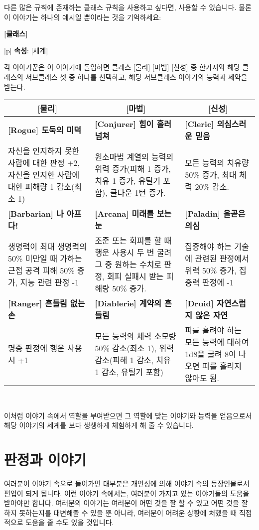 \documentclass[12pt]{report}
\newenvironment{story}[2]
{\begin{center}
		{\large \textbf{[#1]}}\\[1ex]
		\begin{tabular}{|p{\textwidth}|}
			\hline
			\textbf{속성}: #2
			\\
			\hline
		}
		{ 
			\\\hline
		\end{tabular}
	\end{center}
}
\newcommand{\world}[1]{{\nanumpen \large #1 \par}\bigskip}
\begin{document}
	다른 많은 규칙에 존재하는 클래스 규칙을 사용하고 싶다면, 사용할 수 있습니다. 물론 이 이야기는 하나의 예시일 뿐이라는 것을 기억하세요:
	\begin{story}{클래스}{[세계]}
		각 이야기꾼은 이 이야기에 돌입하면 클래스 [물리] [마법] [신성] 중 한가지와 해당 클래스의 서브클래스 셋 중 하나를 선택하고, 해당 서브클래스 이야기의 능력과 제약을 받는다.
		
		\begin{tabularx}{\textwidth}{X|X|X}
			\multicolumn{1}{c|}{\textbf{[물리]}} & \multicolumn{1}{c|}{\textbf{[마법]}} & \multicolumn{1}{c}{\textbf{[신성]}} \\ \hline
			\textbf{[Rogue] 도둑의 미덕} & \textbf{[Conjurer] 힘이 흘러넘쳐} & \textbf{[Cleric] 의심스러운 믿음} \\
			{자신을 인지하지 못한 사람에 대한 판정 +2, 자신을 인지한 사람에 대한 피해량 1 감소(최소 1)} & {원소마법 계열의 능력의 위력 증가(피해 1 증가, 치유 1 증가, 유틸기 포함), 쿨다운 1턴 증가.} & {모든 능력의 치유량 50\% 증가, 최대 체력 20\% 감소.} \\\hline
			\textbf{[Barbarian] 나 아프다!} & \textbf{[Arcana] 미래를 보는 눈} & \textbf{[Paladin] 올곧은 의심} \\ 
			{생명력이 최대 생명력의 50\% 미만일 때 가하는 근접 공격 피해 50\% 증가, 지능 관련 판정 -1} & {조준 또는 회피를 할 때 행운 사용시 두 번 굴려 그 중 원하는 수치로 판정, 회피 실패시 받는 피해량 50\% 증가.} & {집중해야 하는 기술에 관련된 판정에서 위력 50\% 증가, 집중력 판정에 -1} \\ \hline
			\textbf{[Ranger] 흔들림 없는 손} & \textbf{[Diablerie] 계약의 흔들림} & \textbf{[Druid] 자연스럽지 않은 자연} \\ 
			{명중 판정에 행운 사용시 +1} & {모든 능력의 체력 소모량 50\% 감소(최소 1), 위력 감소(피해 1 감소, 치유 1 감소, 유틸기 포함)} & {피를 흘려야 하는 모든 능력에 대하여 1d8을 굴려 8이 나오면 피를 흘리지 않아도 됨.}
		\end{tabularx}
	\end{story}
	
	이처럼 이야기 속에서 역할을 부여받으면 그 역할에 맞는 이야기와 능력을 얻음으로서 해당 이야기의 세계를 보다 생생하게 체험하게 해 줄 수 있습니다.
	
	\chapter{판정과 이야기}
	\world{여러분이 이야기 속으로 들어가면 대부분은 개연성에 의해 이야기 속의 등장인물로서 편입이 되게 됩니다. 이런 이야기 속에서는, 여러분이 가지고 있는 이야기들의 도움을 받아야만 합니다. 여러분의 이야기는 여러분이 어떤 것을 잘 할 수 있고 어떤 것을 잘 하지 못하는지를 대변해줄 수 있을 뿐 아니라, 여러분이 어려운 상황에 처했을 때 직접적으로 도움을 줄 수도 있을 것입니다.}
	
\end{document}
